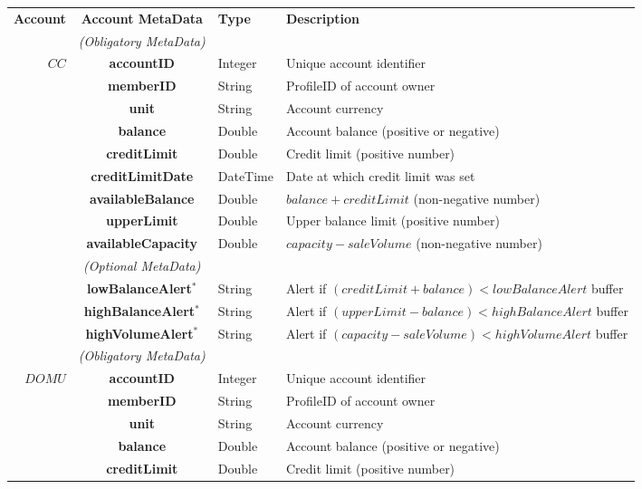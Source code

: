 \begin{table}[H]
\begin{centering}
\small
{
\begin{tabular}{ r | c | l | l }
\hline
\textbf{Account}	& {\bf Account MetaData} & {\bf Type} & {\bf Description} \\
\Xhline{1.5pt}
			 & \emph{(Obligatory MetaData)}& & \\
\cline{2-2}
$CC$		& {\bf accountID}			&Integer	& Unique account identifier \\
			& {\bf memberID}			&String	& ProfileID of account owner \\
			& {\bf unit}					&String	& Account currency \\
			& {\bf balance}				&Double	& Account balance (positive or negative) \\
			& {\bf creditLimit}			&Double	& Credit limit (positive number) \\
			& {\bf creditLimitDate}		&DateTime & Date at which credit limit was set \\
			& {\bf availableBalance}		&Double	& $balance + creditLimit$ (non-negative number) \\
			& {\bf upperLimit}			&Double	& Upper balance limit (positive number) \\
			& {\bf availableCapacity}		&Double	& $capacity - saleVolume$ (non-negative number) \\
\cline{2-2}
			 & \emph{(Optional MetaData)}& & \\
\cline{2-2}
			& {\bf lowBalanceAlert$^*$}		&String	& Alert if $(creditLimit + balance) < lowBalanceAlert$ buffer \\
			& {\bf highBalanceAlert$^*$}		&String	& Alert if $(upperLimit - balance) < highBalanceAlert$ buffer \\
			& {\bf highVolumeAlert$^*$}		&String	& Alert if $(capacity - saleVolume) < highVolumeAlert$ buffer \\
\Xhline{1.5pt}
			 & \emph{(Obligatory MetaData)}& & \\
\cline{2-2}
$DOMU$		& {\bf accountID}			&Integer	& Unique account identifier \\
			& {\bf memberID}			&String	& ProfileID of account owner \\
			& {\bf unit}					&String	& Account currency \\
			& {\bf balance}				&Double	& Account balance (positive or negative) \\
			& {\bf creditLimit}			&Double	& Credit limit (positive number) \\

\end{tabular}}
\end{centering}
\end{table}
